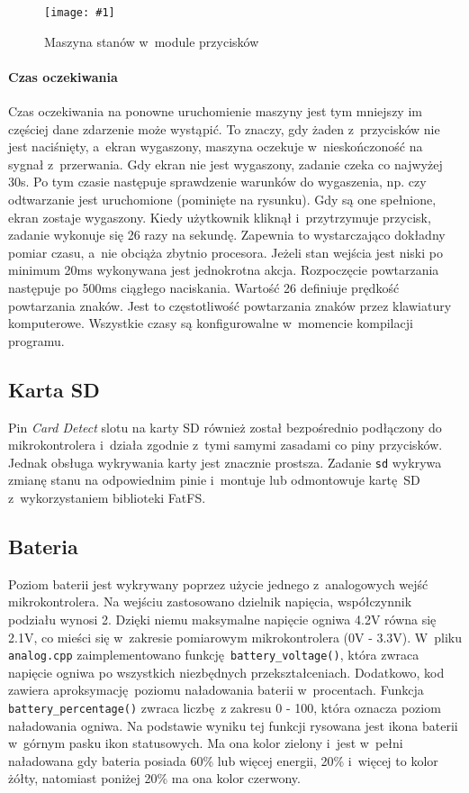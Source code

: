 \documentclass[polish]{aghengthesis}
\newcommand{\imgint}[4]{
	\begin{figure}[{#4}]
		\centering
		\texttt{[image: \#1]}
		\caption{#2}
		\label{#1}
	\end{figure}
}
\newcommand{\imgh}[3]{\imgint{#1}{#2}{#3}{H}}
\begin{document}
			\imgh{3/PicoRadio-buttons}{Maszyna stanów w~module przycisków}{0.75}
			
			\paragraph{Czas oczekiwania}
				Czas oczekiwania na ponowne uruchomienie maszyny jest tym mniejszy im częściej dane zdarzenie może wystąpić. To znaczy, gdy żaden z~przycisków nie jest naciśnięty, a~ekran wygaszony, maszyna oczekuje w~nieskończoność na sygnał z~przerwania. Gdy ekran nie jest wygaszony, zadanie czeka co najwyżej 30s. Po tym czasie następuje sprawdzenie warunków do wygaszenia, np. czy odtwarzanie jest uruchomione (pominięte na rysunku). Gdy są one spełnione, ekran zostaje wygaszony. Kiedy użytkownik kliknął i~przytrzymuje przycisk, zadanie wykonuje się 26 razy na sekundę. Zapewnia to wystarczająco dokładny pomiar czasu, a~nie obciąża zbytnio procesora. Jeżeli stan wejścia jest niski po minimum 20ms wykonywana jest jednokrotna akcja. Rozpoczęcie powtarzania następuje po 500ms ciągłego naciskania. Wartość 26 definiuje prędkość powtarzania znaków. Jest to częstotliwość powtarzania znaków przez klawiatury komputerowe. Wszystkie czasy są konfigurowalne w~momencie kompilacji programu.
		
		\subsection{Karta SD}
			Pin \textit{Card Detect} slotu na karty SD również został bezpośrednio podłączony do mikrokontrolera i~działa zgodnie z~tymi samymi zasadami co piny przycisków. Jednak obsługa wykrywania karty jest znacznie prostsza. Zadanie \lstinline|sd| wykrywa zmianę stanu na odpowiednim pinie i~montuje lub odmontowuje kartę SD z~wykorzystaniem biblioteki FatFS.
			
		\subsection{Bateria}
			Poziom baterii jest wykrywany poprzez użycie jednego z~analogowych wejść mikrokontrolera. Na wejściu zastosowano dzielnik napięcia, współczynnik podziału wynosi 2. Dzięki niemu maksymalne napięcie ogniwa 4.2V równa się 2.1V, co mieści się w~zakresie pomiarowym mikrokontrolera (0V - 3.3V). W~pliku \lstinline|analog.cpp| zaimplementowano funkcję \lstinline|battery_voltage()|, która zwraca napięcie ogniwa po wszystkich niezbędnych przekształceniach. Dodatkowo, kod zawiera aproksymację poziomu naładowania baterii w~procentach. Funkcja \lstinline|battery_percentage()| zwraca liczbę z zakresu 0 - 100, która oznacza poziom naładowania ogniwa. Na podstawie wyniku tej funkcji rysowana jest ikona baterii w~górnym pasku ikon statusowych. Ma ona kolor zielony i~jest w~pełni naładowana gdy bateria posiada 60\% lub więcej energii, 20\% i~więcej to kolor żółty, natomiast poniżej 20\% ma ona kolor czerwony.
		
\end{document}

